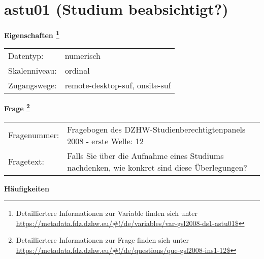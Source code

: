 
    \setcounter{footnote}{0}

    \vspace*{-1.8cm}
	\section{astu01 (Studium beabsichtigt?)}
	\label{section:astu01}



    \vspace*{0.5cm}
    \noindent\textbf{Eigenschaften
	\footnote{Detailliertere Informationen zur Variable finden sich unter
		\url{https://metadata.fdz.dzhw.eu/\#!/de/variables/var-gsl2008-ds1-astu01$}}}\\
	\begin{tabularx}{\hsize}{@{}lX}
	Datentyp: & numerisch \\
	Skalenniveau: & ordinal \\
	Zugangswege: &
	  remote-desktop-suf, 
	  onsite-suf
 \\
    \end{tabularx}



				\vspace*{0.5cm}
                \noindent\textbf{Frage
	                \footnote{Detailliertere Informationen zur Frage finden sich unter
		              \url{https://metadata.fdz.dzhw.eu/\#!/de/questions/que-gsl2008-ins1-12$}}}\\
				\begin{tabularx}{\hsize}{@{}lX}
					Fragenummer: &
					  Fragebogen des DZHW-Studienberechtigtenpanels 2008 - erste Welle:
					  12
 \\
					Fragetext: & Falls Sie über die Aufnahme eines Studiums nachdenken, wie konkret sind diese Überlegungen? \\
				\end{tabularx}





        		\vspace*{0.5cm}
                \noindent\textbf{Häufigkeiten}


